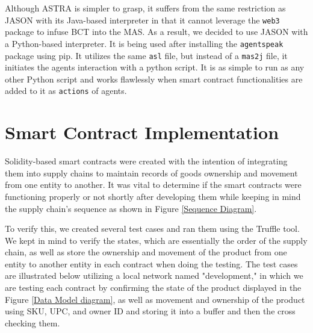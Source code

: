\vspace{.5cm}

Although ASTRA is simpler to grasp, it suffers from the same restriction as JASON with its Java-based interpreter in that it cannot leverage the \texttt{web3} package to infuse \ac{BCT} into the \ac{MAS}. As a result, we decided to use JASON with a Python-based interpreter. It is being used after installing the \texttt{agentspeak} package using \ac{pip}. It utilizes the same \texttt{asl} file, but instead of a \texttt{mas2j} file, it initiates the agents interaction with a python script. It is as simple to run as any other Python script and works flawlessly when smart contract functionalities are added to it as \texttt{actions} of agents.

\section{Smart Contract Implementation }

Solidity-based smart contracts were created with the intention of integrating them into supply chains to maintain records of goods ownership and movement from one entity to another. It was vital to determine if the smart contracts were functioning properly or not shortly after developing them while keeping in mind the supply chain's sequence as shown in Figure \ref{Sequence Diagram}. 

\vspace{.5cm}

To verify this, we created several test cases and ran them using the Truffle tool. We kept in mind to verify the states, which are essentially the order of the supply chain, as well as store the ownership and movement of the product from one entity to another entity in each contract when doing the testing. The test cases are illustrated below utilizing a local network named "development," in which we are testing each contract by confirming the state of the product displayed in the Figure \ref{Data Model diagram}, as well as movement and ownership of the product using \ac{SKU}, \ac{UPC}, and owner ID and storing it into a buffer and then the cross checking them.

\vspace{.5cm}


